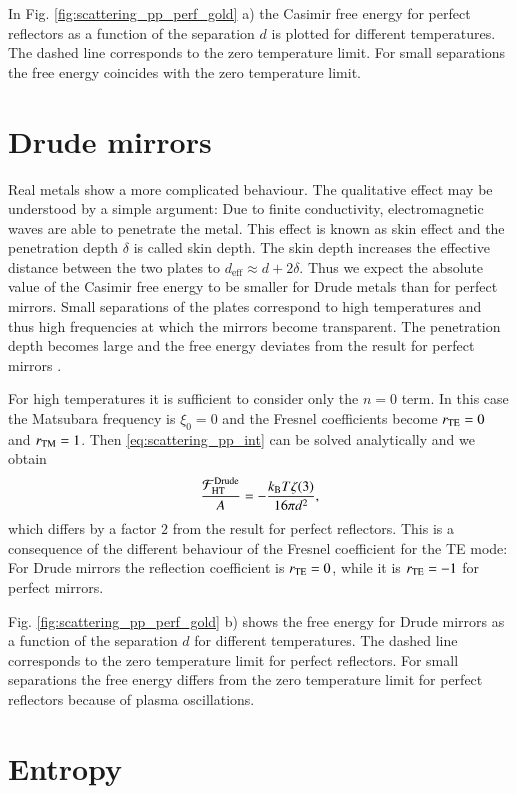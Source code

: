 In Fig. \ref{fig:scattering_pp_perf_gold} a) the Casimir free energy for
perfect reflectors as a function of the separation $d$ is plotted for different
temperatures. The dashed line corresponds to the zero temperature limit. For
small separations the free energy coincides with the zero temperature limit.


\section{Drude mirrors}
\label{section_scattering_pp_drude}

Real metals show a more complicated behaviour. The qualitative effect may be
understood by a simple argument: Due to finite conductivity, electromagnetic
waves are able to penetrate the metal. This effect is known as skin effect and
the penetration depth $\delta$ is called skin depth. The skin depth increases
the effective distance between the two plates to $d_\text{eff}\approx
d+2\delta$. Thus we expect the absolute value of the Casimir free energy to be
smaller for Drude metals than for perfect mirrors. Small separations of the
plates correspond to high temperatures and thus high frequencies at which the
mirrors become transparent. The penetration depth becomes large and the free
energy deviates from the result for perfect mirrors \cite{jaffe2005casimir}.

For high temperatures it is sufficient to consider only the $n=0$ term. In this
case the Matsubara frequency is $\xi_0=0$ and the Fresnel coefficients become
$r_{\mathrm{TE}}=0$ and $r_{\mathrm{TM}}=1$. Then \eqref{eq:scattering_pp_int} can be solved
analytically and we obtain
\begin{equation}
\frac{\mathcal{F}^\text{Drude}_\text{HT}}{A} = -\frac{k_\text{B} T \zeta(3)}{16 \pi d^2},
\end{equation}
which differs by a factor $2$ from the result for perfect reflectors. This is a
consequence of the different behaviour of the Fresnel coefficient for the TE
mode: For Drude mirrors the reflection coefficient is $r_{\mathrm{TE}} = 0$, while it is
$r_{\mathrm{TE}} = -1$ for perfect mirrors.

Fig. \ref{fig:scattering_pp_perf_gold} b) shows the free energy for Drude
mirrors as a function of the separation $d$ for different temperatures. The
dashed line corresponds to the zero temperature limit for perfect reflectors.
For small separations the free energy differs from the zero temperature limit
for perfect reflectors because of plasma oscillations.


\section{Entropy}

